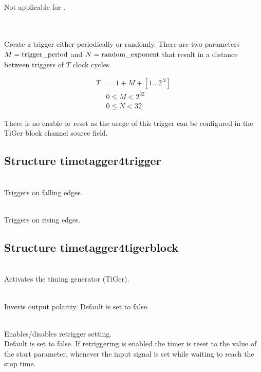 			\\
			Not applicable for \deviceName.

			\\
			\\
			Create a trigger either periodically or randomly. There are two parameters $M = \text{trigger\textunderscore period}$ and $N = \text{random\textunderscore exponent}$ that result in a distance between triggers of $T$ clock cycles.

			\begin{align}
				T &= 1 + M + [1...2^N]\\
				&0 \leq M < 2^{32}\\
				&0 \leq N < 32
			\end{align}

			\noindent There is no enable or reset as the usage of this trigger can be configured in the TiGer block channel source field.\par

		\subsection{Structure timetagger4\tu trigger}

			\\
			Triggers on falling edges.\par

			\\
			Triggers on rising edges.\par

		\subsection{Structure timetagger4\tu tiger\tu block\label{cp:tigerblock}}

		\\
		Activates the timing generator (TiGer).\par

		\\
		Inverts output polarity. Default is set to false.\par

		\\
		Enables/disables retrigger setting.\\
		Default is set to false. If retriggering is enabled the timer is reset to the value of the start parameter, whenever the input signal is set while waiting to reach the stop time.\par

